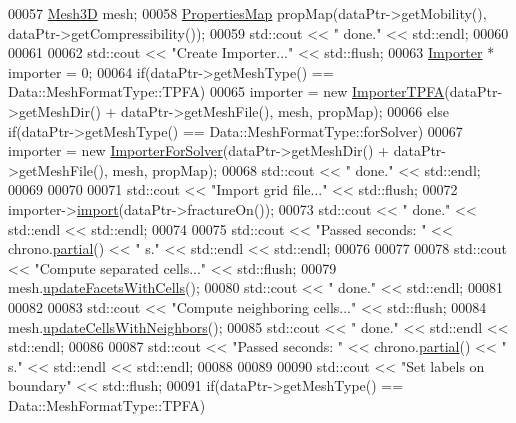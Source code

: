 \begin{DoxyCode}
00057     \hyperlink{classFVCode3D_1_1Mesh3D}{Mesh3D} mesh;
00058     \hyperlink{classFVCode3D_1_1PropertiesMap}{PropertiesMap} propMap(dataPtr->getMobility(), dataPtr->getCompressibility());
00059     std::cout << \textcolor{stringliteral}{" done."} << std::endl;
00060 
00061 
00062     std::cout << \textcolor{stringliteral}{"Create Importer..."} << std::flush;
00063     \hyperlink{classFVCode3D_1_1Importer}{Importer} * importer = 0;
00064     \textcolor{keywordflow}{if}(dataPtr->getMeshType() == Data::MeshFormatType::TPFA)
00065         importer = \textcolor{keyword}{new} \hyperlink{classFVCode3D_1_1ImporterTPFA}{ImporterTPFA}(dataPtr->getMeshDir() + dataPtr->getMeshFile(), mesh, 
      propMap);
00066     \textcolor{keywordflow}{else} \textcolor{keywordflow}{if}(dataPtr->getMeshType() == Data::MeshFormatType::forSolver)
00067         importer = \textcolor{keyword}{new} \hyperlink{classFVCode3D_1_1ImporterForSolver}{ImporterForSolver}(dataPtr->getMeshDir() + dataPtr->getMeshFile(), 
      mesh, propMap);
00068     std::cout << \textcolor{stringliteral}{" done."} << std::endl;
00069 
00070 
00071     std::cout << \textcolor{stringliteral}{"Import grid file..."} << std::flush;
00072     importer->\hyperlink{classFVCode3D_1_1Importer_aee8e68c30c3fd4a01f10a5a4365b30ea}{import}(dataPtr->fractureOn());
00073     std::cout << \textcolor{stringliteral}{" done."} << std::endl << std::endl;
00074 
00075     std::cout << \textcolor{stringliteral}{"Passed seconds: "} << chrono.\hyperlink{classFVCode3D_1_1Chrono_a245a0c47da85e80de56e85d3689b925b}{partial}() << \textcolor{stringliteral}{" s."} << std::endl << std::endl;
00076 
00077 
00078     std::cout << \textcolor{stringliteral}{"Compute separated cells..."} << std::flush;
00079     mesh.\hyperlink{classFVCode3D_1_1Mesh3D_ab1595d6ad6373719cf597c323ed6909b}{updateFacetsWithCells}();
00080     std::cout << \textcolor{stringliteral}{" done."} << std::endl;
00081 
00082 
00083     std::cout << \textcolor{stringliteral}{"Compute neighboring cells..."} << std::flush;
00084     mesh.\hyperlink{classFVCode3D_1_1Mesh3D_a32920906ccad9ef0572ebc4009214c86}{updateCellsWithNeighbors}();
00085     std::cout << \textcolor{stringliteral}{" done."} << std::endl << std::endl;
00086 
00087     std::cout << \textcolor{stringliteral}{"Passed seconds: "} << chrono.\hyperlink{classFVCode3D_1_1Chrono_a245a0c47da85e80de56e85d3689b925b}{partial}() << \textcolor{stringliteral}{" s."} << std::endl << std::endl;
00088 
00089 
00090     std::cout << \textcolor{stringliteral}{"Set labels on boundary"} << std::flush;
00091     \textcolor{keywordflow}{if}(dataPtr->getMeshType() == Data::MeshFormatType::TPFA)

\end{DoxyCode}
